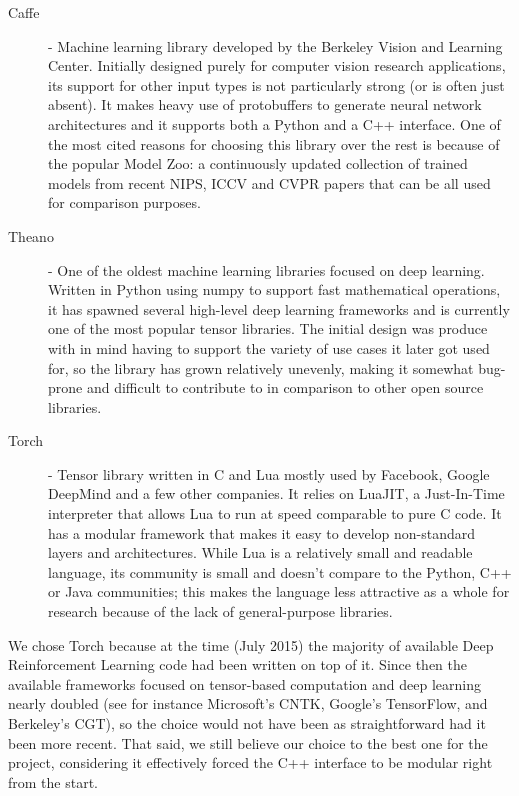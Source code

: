 \begin{description}
\item [Caffe \citep{jia2014caffe}] - Machine learning library developed by the
  Berkeley Vision and Learning Center. Initially designed purely for computer
  vision research applications, its support for other input types is not
  particularly strong (or is often just absent). It makes heavy use of
  protobuffers to generate neural network architectures and it supports both a
  Python and a C++ interface. One of the most cited reasons for choosing this
  library over the rest is because of the popular Model Zoo: a continuously
  updated collection of trained models from recent NIPS, ICCV and CVPR papers
  that can be all used for comparison purposes.
  
\item [Theano \citep{bergstra2010theano}] - One of the oldest machine learning
  libraries focused on deep learning. Written in Python using numpy to support
  fast mathematical operations, it has spawned several high-level deep learning
  frameworks and is currently one of the most popular tensor libraries. The
  initial design was produce with in mind having to support the variety of use
  cases it later got used for, so the library has grown relatively unevenly,
  making it somewhat bug-prone and difficult to contribute to in comparison to
  other open source libraries.

\item [Torch \citep{collobert2011torch}] - Tensor library written in C and Lua
  mostly used by Facebook, Google DeepMind and a few other companies. It relies
  on LuaJIT, a Just-In-Time interpreter that allows Lua to run at speed
  comparable to pure C code. It has a modular framework that makes it easy to
  develop non-standard layers and architectures. While Lua is a relatively small
  and readable language, its community is small and doesn't compare to the
  Python, C++ or Java communities; this makes the language less attractive as a
  whole for research because of the lack of general-purpose libraries.
\end{description}

We chose Torch because at the time (July 2015) the majority of available Deep
Reinforcement Learning code had been written on top of it. Since then the
available frameworks focused on tensor-based computation and deep learning
nearly doubled (see for instance Microsoft's CNTK, Google's TensorFlow, and
Berkeley's CGT), so the choice would not have been as straightforward had it
been more recent. That said, we still believe our choice to the best one for the
project, considering it effectively forced the C++ interface to be modular right
from the start.
 
